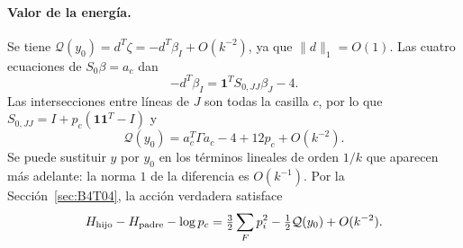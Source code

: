 \paragraph{Valor de la energía.}
Se tiene $\mathcal Q(y_0)=d^T\zeta=-d^T\beta_I+O(k^{-2})$,
ya que $\|d\|_1=O(1)$. Las cuatro ecuaciones de $S_0\beta=a_c$ dan
\[
 -d^T\beta_I=\mathbf1^TS_{0,JJ}\beta_J-4.
\]
Las intersecciones entre líneas de $J$ son todas la casilla $c$, por lo que
$S_{0,JJ}=I+p_c(\mathbf1\mathbf1^T-I)$ y
\[
 \boxed{\mathcal Q(y_0)=a_c^T\Gamma a_c-4+12p_c+O(k^{-2}).}
\]
Se puede sustituir $y$ por $y_0$ en los términos lineales de orden $1/k$
que aparecen más adelante: la norma $1$ de la diferencia es $O(k^{-1})$.
Por la Sección~\ref{sec:B4T04}, la acción verdadera satisface
\[
 H_{\rm hijo}-H_{\rm padre}-\log p_c
 =\tfrac32\sum_Fp_i^2-\tfrac12\mathcal Q(y_0)+O(k^{-2}).
\]
